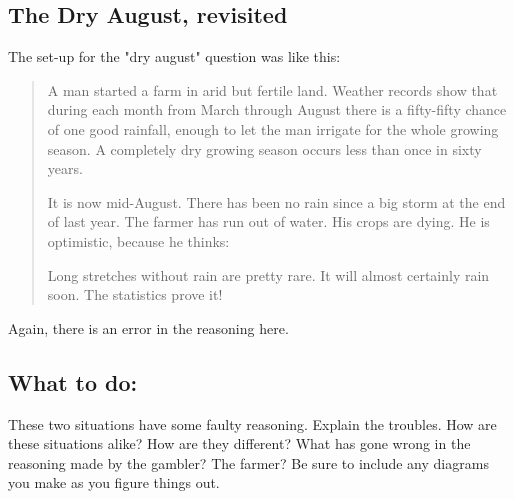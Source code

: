\documentclass[12pt,letterpaper]{article}
\begin{document}
\subsection*{The Dry August, revisited} The set-up for the "dry august" question was like this:
\begin{quotation}
A man started a farm in arid but fertile land. Weather records show that during each month from March through August there is a fifty-fifty chance of one good rainfall, enough to let the man irrigate for the whole growing season. A completely dry growing season occurs less than once in sixty years.

It is now mid-August. There has been no rain since a big storm at the end of last year. The farmer has run out of water. His crops are dying. He is optimistic, because he thinks:
\begin{center}
Long stretches without rain are pretty rare. It will almost certainly rain soon. The statistics prove it!
\end{center}
\end{quotation}
Again, there is an error in the reasoning here.

\subsection*{What to do:}

These two situations have some faulty reasoning.
Explain the troubles. 
How are these situations alike? 
How are they different?
What has gone wrong in the reasoning made by the gambler? The farmer?
Be sure to include any diagrams you make as you figure things out.
\end{document}
